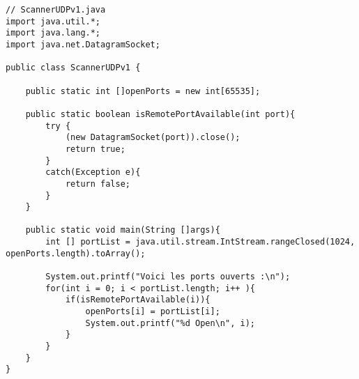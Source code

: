 \documentclass{article}
\begin{document}
\begin{lstlisting}
// ScannerUDPv1.java
import java.util.*;
import java.lang.*;
import java.net.DatagramSocket;

public class ScannerUDPv1 {

    public static int []openPorts = new int[65535];

    public static boolean isRemotePortAvailable(int port){
        try {
            (new DatagramSocket(port)).close();
            return true;
        }
        catch(Exception e){
            return false;
        }
    }

    public static void main(String []args){
        int [] portList = java.util.stream.IntStream.rangeClosed(1024, openPorts.length).toArray();

        System.out.printf("Voici les ports ouverts :\n");
        for(int i = 0; i < portList.length; i++ ){
            if(isRemotePortAvailable(i)){
                openPorts[i] = portList[i];
                System.out.printf("%d Open\n", i);
            }
        }
    }
}

\end{lstlisting}
\end{document}
